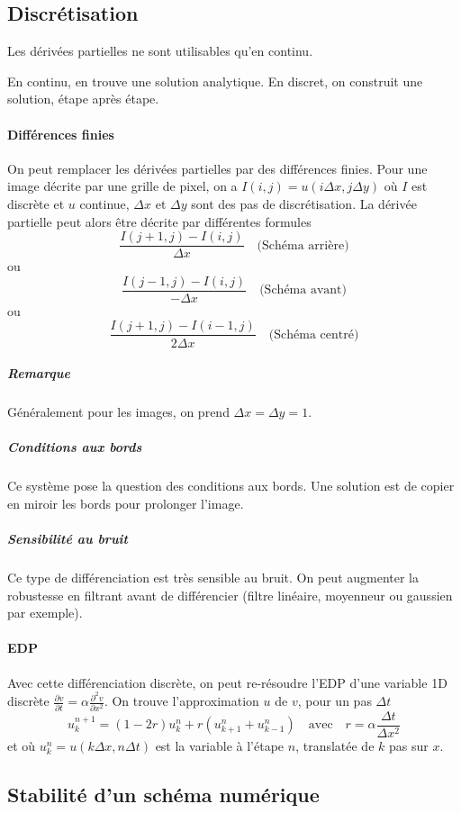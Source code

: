 \documentclass[french]{article}
\begin{document}
\subsection{Discrétisation}
Les dérivées partielles ne sont utilisables qu'en continu.

En continu, en trouve une solution analytique.
En discret, on construit une solution, étape après étape.

\paragraph{Différences finies} On peut remplacer les dérivées partielles
par des différences finies. Pour une image décrite par une grille de pixel,
on a $I(i,j) = u(i\Delta x, j\Delta y)$ où $I$ est discrète et $u$ continue,
$\Delta x$ et $\Delta y$ sont des pas de discrétisation.
La dérivée partielle peut alors être décrite par différentes formules
$$\frac{I(j + 1,j) - I(i,j)}{\Delta x} \quad \text{(Schéma arrière)}$$
ou
$$\frac{I(j - 1,j) - I(i,j)}{-\Delta x} \quad \text{(Schéma avant)} $$
ou
$$\frac{I(j + 1,j) - I(i - 1,j)}{2\Delta x} \quad \text{(Schéma centré)} $$

\subparagraph{Remarque} Généralement pour les images, on prend
$\Delta x = \Delta y = 1$.

\subparagraph{Conditions aux bords} Ce système pose la question des
conditions aux bords. Une solution est de copier en miroir les bords pour
prolonger l'image.

\subparagraph{Sensibilité au bruit} Ce type de différenciation est très
sensible au bruit. On peut augmenter la robustesse en filtrant avant de
différencier (filtre linéaire, moyenneur ou gaussien par exemple).

\paragraph{EDP} Avec cette différenciation discrète, on peut re-résoudre
l'EDP d'une variable 1D discrète
$\frac{\partial v}{\partial t} = \alpha \frac{\partial^2 v}{\partial x ^2}$.
On trouve l'approximation $u$ de $v$, pour un pas $\Delta t$
$$u_k^{n+1} = (1 - 2r)u_k^n + r(u_{k+1}^n + u_{k-1}^n)
\quad\text{avec}\quad r = \alpha \frac{\Delta t}{\Delta x^2}$$
et où $u_k^n = u(k\Delta x, n\Delta t)$ est la variable à l'étape $n$,
translatée de $k$ pas sur $x$.

\subsection{Stabilité d'un schéma numérique}
\end{document}
